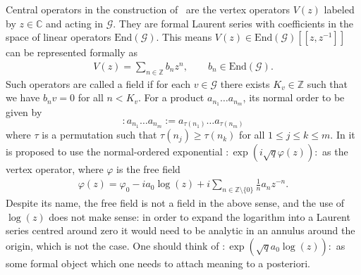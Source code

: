 \documentclass[letterpaper, DIV=17]{scrartcl}
\numberwithin{equation}{section}
\theoremstyle{definition}
\begin{document}
		Central operators in the construction of~\cite{estienne2013fractional} are the vertex operators $V(z)$ labeled by $ z \in \mathbb{C} $ and acting in $\mathcal{G}$. They are formal Laurent series with coefficients in the space of linear operators $\mathrm{End}(\mathcal{G})$. This means $V(z)\in \mathrm{End}(\mathcal{G})[[z, z^{-1}]]$ can be represented formally as 
		\begin{align*}
			V(z) = \sum_{n\in \mathbb{Z}} b_n z^n, \qquad b_n \in \mathrm{End}(\mathcal{G}).
		\end{align*} 
		Such operators are called a field if for each $v\in \mathcal{G} $ there exists $K_v\in \mathbb{Z}$ such that we have $b_n v=0$ for all $n<K_v$. For a product $a_{n_1} \dots a_{n_m}$,  its normal order to be given by 
		$$:a_{n_1} \dots a_{n_m}:=a_{\tau(n_1)} \dots a_{\tau(n_m)}$$
		where $\tau$ is a permutation such that $\tau(n_j)\geq \tau(n_{k})$ for all $1\leq j\leq k \leq m$.
		In \cite{estienne2013fractional} it is proposed to use the normal-ordered exponential $:\exp(i\sqrt{q} \varphi(z)) :$ as the vertex operator, where $\varphi$ is the free field
		\begin{align*}
			\varphi(z) = \varphi_0 -i a_0 \log(z) + i \sum_{n\in \mathbb{Z}\setminus \{0\}} \frac{1}{n} a_n z^{-n}.
		\end{align*}
		Despite its name, the free field is not a field in the above sense, and the use of $\log(z)$ does not make sense: in order to expand the logarithm into a Laurent series centred around zero it would need to be analytic in an annulus around the origin, which is not the case. One should think of $: \exp(\sqrt{q} a_0 \log(z)):$ as some formal object which one needs to attach meaning to a posteriori.
\end{document}
